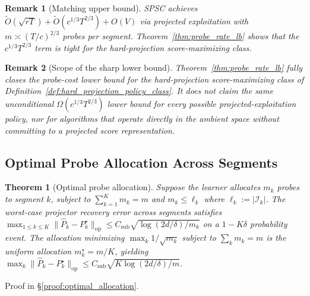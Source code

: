 \documentclass{article}
\newcommand{\op}{\mathrm{op}}
\newcommand{\cI}{\mathcal{I}}
\newtheorem{theorem}{Theorem}
\newtheorem{remark}{Remark}
\begin{document}
\begin{remark}[Matching upper bound]
SPSC achieves $\widetilde{O}(\sqrt{rT}) + \widetilde{O}(c^{1/3}T^{2/3}) + O(V)$ via projected exploitation with $m \asymp (T/c)^{2/3}$ probes per segment.  Theorem~\ref{thm:probe_rate_lb} shows that the $c^{1/3}T^{2/3}$ term is tight for the hard-projection score-maximizing class.
\end{remark}

\begin{remark}[Scope of the sharp lower bound]
\label{rem:sharp_lb_scope}
Theorem~\ref{thm:probe_rate_lb} fully closes the probe-cost lower bound for the hard-projection score-maximizing class of Definition~\ref{def:hard_projection_policy_class}.
It does not claim the same unconditional $\Omega(c^{1/3}T^{2/3})$ lower bound for every possible projected-exploitation policy, nor for algorithms that operate directly in the ambient space without committing to a projected score representation.
\end{remark}

\subsection{Optimal Probe Allocation Across Segments}
\label{app:probe_allocation}

\begin{theorem}[Optimal probe allocation]
\label{thm:optimal_allocation}
Suppose the learner allocates $m_k$ probes to segment $k$, subject to $\sum_{k=1}^K m_k = m$ and $m_k \le \ell_k$ where $\ell_k := |\cI_k|$.  The worst-case projector recovery error across segments satisfies
$\max_{1 \le k \le K} \|\widehat{P}_k - P_k^\star\|_{\op} \le C_{\mathrm{sub}} \sqrt{\log(2d/\delta)/m_k}$
on a $1-K\delta$ probability event.  The allocation minimizing $\max_k 1/\sqrt{m_k}$ subject to $\sum_k m_k = m$ is the uniform allocation $m_k^\star = m/K$,
yielding $\max_k \|\widehat{P}_k - P_k^\star\|_{\op} \le C_{\mathrm{sub}}\sqrt{K\log(2d/\delta) / m}$.
\end{theorem}

Proof in \S\ref{proof:optimal_allocation}.
\end{document}
